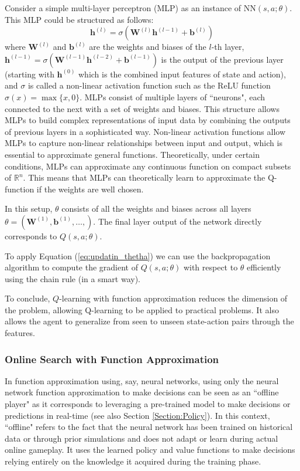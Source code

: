 \documentclass[letter,11pt]{article}
\begin{document}
Consider a simple multi-layer perceptron (MLP) as an instance of \( \text{NN}(s, a; \theta) \). This MLP could be structured as follows:
  \[
    \mathbf{h}^{(l)} = \sigma(\mathbf{W}^{(l)} \mathbf{h}^{(l-1)} + \mathbf{b}^{(l)})
    \]
    where \( \mathbf{W}^{(l)} \) and \( \mathbf{b}^{(l)} \) are the weights and biases of the \( l \)-th layer, \( \mathbf{h}^{(l-1)} =  \sigma(\mathbf{W}^{(l-1)} \mathbf{h}^{(l-2)} + \mathbf{b}^{(l-1)})\) is the output of the previous layer (starting with \( \mathbf{h}^{(0)} \) which is the combined input features of state and action), and \( \sigma \) is called a non-linear activation function such as the ReLU function $\sigma(x) = \max \{ x,0\}$. MLPs consist of multiple layers of ``neurons", each connected to the next with a set of weights and biases. This structure allows MLPs to build complex representations of input data by combining the outputs of previous layers in a sophisticated way. Non-linear activation functions allow MLPs to capture non-linear relationships between input and output, which is essential to approximate general functions.
    Theoretically, under certain conditions, MLPs can approximate any continuous function on compact subsets of $\mathbb{R}^n$. This means that MLPs can theoretically learn to approximate the Q-function if the weights are well chosen.  
    
In this setup, \( \theta \) consists of all the weights and biases across all layers $ \theta = (\mathbf{W}^{(1)}, \mathbf{b}^{(1)},\ldots, ) $. The final layer output of the network directly corresponds to \( Q(s, a; \theta) \). 


To apply Equation (\ref{eq:updatin_thetha}) we can use the backpropagation algorithm  to compute the gradient of $ Q(s, a; \theta) $  with respect to $\theta$  efficiently 
 using the chain rule (in a smart way). 


To conclude, $Q$-learning with function approximation reduces the dimension of the problem, allowing Q-learning to be applied to practical problems. It also allows the agent to generalize from seen to unseen state-action pairs through the features. 


\subsubsection{Online Search with Function Approximation }

In function approximation using, say, neural networks, 
using only the neural network function approximation to make decisions can be seen as an ``offline player" as it corresponds to leveraging a pre-trained model to make decisions or predictions in real-time (see also Section \ref{Section:Policy}). In this context, ``offline" refers to the fact that the neural network has been trained on historical data or through prior simulations and does not adapt or learn during actual online gameplay. It uses the learned policy and value functions to make decisions  relying entirely on the knowledge it acquired during the training phase.
\end{document}
